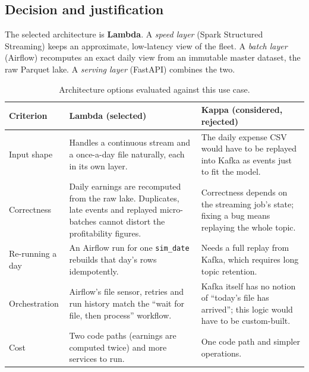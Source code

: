 \documentclass[11pt,a4paper]{article}
\newcommand{\code}[1]{\texttt{\small #1}}
\begin{document}
\subsection{Decision and justification}

The selected architecture is \textbf{Lambda}. A \emph{speed layer} (Spark Structured Streaming)
keeps an approximate, low-latency view of the fleet. A \emph{batch layer} (Airflow) recomputes an
exact daily view from an immutable master dataset, the raw Parquet lake. A \emph{serving layer}
(FastAPI) combines the two.

\begin{table}[H]
\centering\small
\begin{tabularx}{\linewidth}{l Y Y}
\toprule
\textbf{Criterion} & \textbf{Lambda (selected)} & \textbf{Kappa (considered, rejected)} \\
\midrule
Input shape & Handles a continuous stream and a once-a-day file naturally, each in its own
layer. & The daily expense CSV would have to be replayed into Kafka as events just to fit the
model. \\
Correctness & Daily earnings are recomputed from the raw lake. Duplicates, late events and replayed
micro-batches cannot distort the profitability figures. & Correctness depends on the streaming
job's state; fixing a bug means replaying the whole topic. \\
Re-running a day & An Airflow run for one \code{sim\_date} rebuilds that day's rows
idempotently. & Needs a full replay from Kafka, which requires long topic retention. \\
Orchestration & Airflow's file sensor, retries and run history match the ``wait for file, then
process'' workflow. & Kafka itself has no notion of ``today's file has arrived''; this logic
would have to be custom-built. \\
Cost & Two code paths (earnings are computed twice) and more services to run. & One code path and
simpler operations. \\
\bottomrule
\end{tabularx}
\caption{Architecture options evaluated against this use case.}
\label{tab:lambda}
\end{table}
\end{document}

